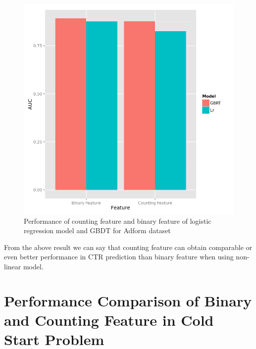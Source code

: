 \begin{figure}[h]
\centering
\includegraphics[width=\columnwidth]{adform.png}
\caption{Performance of counting feature and binary feature of logistic regression model and GBDT for Adform dataset}
\label{fig:adform}
\end{figure}

From the above result we can say that counting feature can obtain comparable or even better performance in CTR prediction than binary feature when using non-linear model.


\section{Performance Comparison of Binary and Counting Feature in Cold Start Problem}



